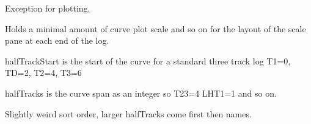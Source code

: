 \documentclass[letterpaper,10pt,english]{sphinxmanual}
\begin{document}

\begin{fulllineitems}
\label{\detokenize{ref/util/plot/Plot:TotalDepth.util.plot.Plot.ExceptionTotalDepthPlotRoll}}
Exception for plotting.

\end{fulllineitems}


\begin{fulllineitems}
\label{\detokenize{ref/util/plot/Plot:TotalDepth.util.plot.Plot.CurvePlotScale}}
Holds a minimal amount of curve plot scale and so on for the layout of
the scale pane at each end of the log.

halfTrackStart is the start of the curve for a standard three track log
T1=0, TD=2, T2=4, T3=6

halfTracks is the curve span as an integer so T23=4 LHT1=1 and so on.

\begin{fulllineitems}
\label{\detokenize{ref/util/plot/Plot:TotalDepth.util.plot.Plot.CurvePlotScale.__lt__}}
Slightly weird sort order, larger halfTracks come first then names.

\end{fulllineitems}


\end{fulllineitems}

\end{document}
